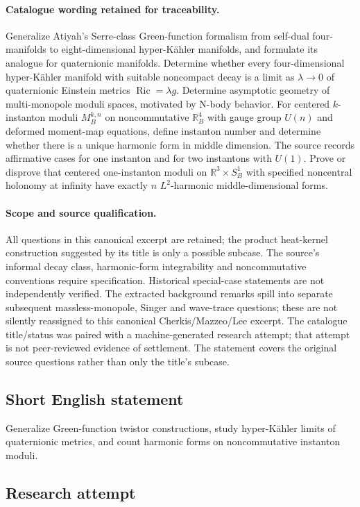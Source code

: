\documentclass[11pt]{article}
\begin{document}
\paragraph{Catalogue wording retained for traceability.}
Generalize Atiyah’s Serre-class Green-function formalism from self-dual four-manifolds to eight-dimensional hyper-Kähler manifolds, and formulate its analogue for quaternionic manifolds. Determine whether every four-dimensional hyper-Kähler manifold with suitable noncompact decay is a limit as $\lambda\to0$ of quaternionic Einstein metrics $\operatorname{Ric}=\lambda g$. Determine asymptotic geometry of multi-monopole moduli spaces, motivated by N-body behavior. For centered $k$-instanton moduli $M_B^{k,n}$ on noncommutative $\mathbb R_B^4$ with gauge group $U(n)$ and deformed moment-map equations, define instanton number and determine whether there is a unique harmonic form in middle dimension. The source records affirmative cases for one instanton and for two instantons with $U(1)$. Prove or disprove that centered one-instanton moduli on $\mathbb R^3\times S_B^1$ with specified noncentral holonomy at infinity have exactly $n$ $L^2$-harmonic middle-dimensional forms.
\paragraph{Scope and source qualification.}All questions in this canonical excerpt are retained; the product heat-kernel construction suggested by its title is only a possible subcase. The source’s informal decay class, harmonic-form integrability and noncommutative conventions require specification. Historical special-case statements are not independently verified. The extracted background remarks spill into separate subsequent massless-monopole, Singer and wave-trace questions; these are not silently reassigned to this canonical Cherkis/Mazzeo/Lee excerpt. The catalogue title/status was paired with a machine-generated research attempt; that attempt is not peer-reviewed evidence of settlement. The statement covers the original source questions rather than only the title’s subcase.
\subsection{Short English statement}
Generalize Green-function twistor constructions, study hyper-Kähler limits of quaternionic metrics, and count harmonic forms on noncommutative instanton moduli.
\subsection{Research attempt}
\end{document}
